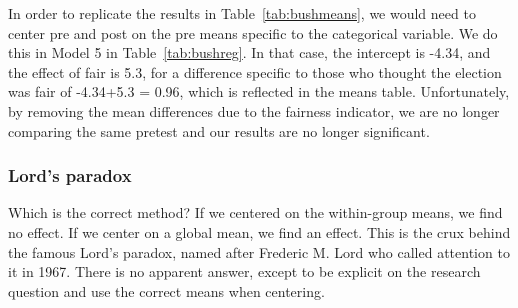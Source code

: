 In order to replicate the results in Table~\ref{tab:bushmeans}, we would need to center pre and post on the pre means specific to the categorical variable. We do this in Model 5 in Table~\ref{tab:bushreg}. In that case, the intercept is -4.34, and the effect of fair is 5.3, for a difference specific to those who thought the election was fair of -4.34+5.3 = 0.96, which is reflected in the means table. Unfortunately, by removing the mean differences due to the fairness indicator, we are no longer comparing the same pretest and our results are no longer significant.

\subsubsection{Lord's paradox}

Which is the correct method? If we centered on the within-group means, we find no effect. If we center on a global mean, we find an effect. This is the crux behind the famous Lord's paradox, named after Frederic M. Lord who called attention to it in 1967. There is no apparent answer, except to be explicit on the research question and use the correct means when centering.

